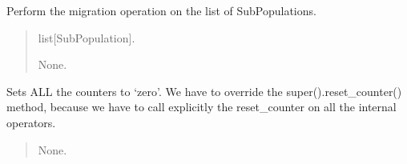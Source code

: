 \documentclass[letterpaper,10pt,english]{sphinxmanual}
\begin{document}
\begin{fulllineitems}
\begin{fulllineitems}
\begin{quote}
\begin{description}
\end{description}\end{quote}

\end{fulllineitems}


\begin{fulllineitems}
\label{\detokenize{pygenalgo.operators.migration:pygenalgo.operators.migration.meta_migration.MetaMigration.migrate}}
\pysigstartsignatures
{}
\pysigstopsignatures
\sphinxAtStartPar
Perform the migration operation on the list of SubPopulations.
\begin{quote}\begin{description}
\sphinxAtStartPar
{} \textendash{} list{[}SubPopulation{]}.

\sphinxAtStartPar
None.

\end{description}\end{quote}

\end{fulllineitems}


\begin{fulllineitems}
\label{\detokenize{pygenalgo.operators.migration:pygenalgo.operators.migration.meta_migration.MetaMigration.reset_counter}}
\pysigstartsignatures
{}
\pysigstopsignatures
\sphinxAtStartPar
Sets ALL the counters to ‘zero’. We have to override the super().reset\_counter()
method, because we have to call explicitly the reset\_counter on all the internal
operators.
\begin{quote}\begin{description}
\sphinxAtStartPar
None.

\end{description}\end{quote}

\end{fulllineitems}


\end{fulllineitems}
\end{document}

